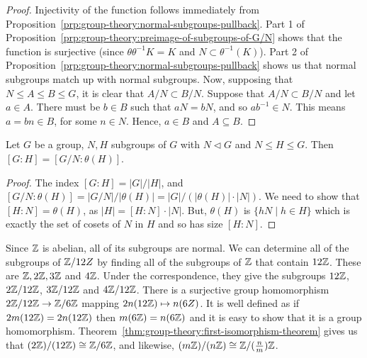 \begin{proof}
  Injectivity of the function follows immediately from Proposition~\ref{prp:group-theory:normal-subgroups-pullback}.
  Part 1 of Proposition~\ref{prp:group-theory:preimage-of-subgroups-of-G/N} shows that the function is surjective (since \(\theta\theta^{-1}K = K\) and \(N \subset \theta^{-1}(K)\)).
  Part 2 of Proposition~\ref{prp:group-theory:normal-subgroups-pullback} shows us that normal subgroups match up with normal subgroups.
  Now, supposing that \(N \leq A \leq B \leq G\), it is clear that \(A/N \subset B/N\).
  Suppose that \(A/N \subset B/N\) and let \(a \in A\).
  There must be \(b \in B\) such that \(aN = bN\), and so \(ab^{-1} \in N\).
  This means \(a = bn \in B\), for some \(n \in N\).
  Hence, \(a \in B\) and \(A \subseteq B\).
\end{proof}

\begin{lemma}\label{lem:group-theory:index-of-quotients}
  Let \(G\) be a group, \(N, H\) subgroups of \(G\) with \(N \triangleleft G\) and \(N \leq H \leq G\). Then \([G : H] = [G/N : \theta(H)]\).
\end{lemma}

\begin{proof}
  The index \([G : H] = |G| / |H|\), and \([G/N : \theta(H)] = |G/N| / |\theta(H)| = |G| / (|\theta(H)| \cdot |N|)\). We need to show that \([H : N] = \theta(H)\), as \(|H| = [H : N] \cdot |N|\). But, \(\theta(H)\) is \(\{hN \mid h \in H\}\) which is exactly the set of cosets of \(N\) in \(H\) and so has size \([H:N]\).
\end{proof}

\begin{example}
  Since \(\mathbb{Z}\) is abelian, all of its subgroups are normal.
  We can determine all of the subgroups of \(\mathbb{Z}/12Z\) by finding all of the subgroups of \(\mathbb{Z}\) that contain \(12\mathbb{Z}\).
  These are \(\mathbb{Z}, 2\mathbb{Z}, 3\mathbb{Z}\) and \(4\mathbb{Z}\).
  Under the correspondence, they give the subgroups \(12\mathbb{Z}\), \(2\mathbb{Z} / 12\mathbb{Z}\), \(3\mathbb{Z} / 12\mathbb{Z}\) and \(4\mathbb{Z} / 12\mathbb{Z}\).
  There is a surjective group homomorphism \(2\mathbb{Z} / 12\mathbb{Z} \to \mathbb{Z}/6\mathbb{Z}\) mapping \(2n(12\mathbb{Z}) \mapsto n(6Z)\).
  It is well defined as if \(2m(12\mathbb{Z}) = 2n(12\mathbb{Z})\) then \(m(6\mathbb{Z}) = n(6\mathbb{Z})\) and it is easy to show that it is a group homomorphism.
  Theorem~\ref{thm:group-theory:first-isomorphism-theorem} gives us that \((2\mathbb{Z}) / (12\mathbb{Z}) \cong \mathbb{Z}/6\mathbb{Z}\), and likewise, \((m\mathbb{Z}) / (n\mathbb{Z}) \cong \mathbb{Z}/(\frac n m)\mathbb{Z}\).
\end{example}

